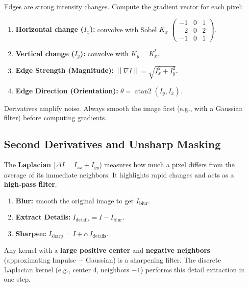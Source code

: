 \documentclass[11pt, oneside]{book}
\newcommand{\norm}[1]{\left\lVert #1 \right\rVert}
\newcommand{\T}{^{\mathsf{T}}}
\begin{document}
\begin{thmbox}[title={Reprojection Error Minimization}]
\begin{defbox}[title={Correlation and Convolution}]
\begin{thmbox}[title={Image Gradient (Edge Detection)}]
Edges are strong intensity changes. Compute the gradient vector for each pixel:
\begin{enumerate}
  \item \textbf{Horizontal change ($I_x$):} convolve with Sobel $K_x$ $\left(\begin{smallmatrix}-1&0&1\\-2&0&2\\-1&0&1\end{smallmatrix}\right)$.
  \item \textbf{Vertical change ($I_y$):} convolve with $K_y=K_x^{\T}$.
  \item \textbf{Edge Strength (Magnitude):} $\norm{\nabla I} = \sqrt{I_x^2 + I_y^2}$.
  \item \textbf{Edge Direction (Orientation):} $\theta = \operatorname{atan2}(I_y, I_x)$.
\end{enumerate}
\end{thmbox}

Derivatives amplify noise. Always smooth the image first (e.g., with a Gaussian filter) before computing gradients.

\subsection{Second Derivatives and Unsharp Masking}

\begin{defbox}[title={Laplacian}]
The \textbf{Laplacian} ($\Delta I = I_{xx} + I_{yy}$) measures how much a pixel differs from the average of its
immediate neighbors. It highlights rapid changes and acts as a \textbf{high-pass filter}.
\end{defbox}

\begin{thmbox}[title={Unsharp Masking}]
\begin{enumerate}
  \item \textbf{Blur:} smooth the original image to get $I_{\text{blur}}$.
  \item \textbf{Extract Details:} $I_{\text{details}} = I - I_{\text{blur}}$.
  \item \textbf{Sharpen:} $I_{\text{sharp}} = I + \alpha\,I_{\text{details}}$.
\end{enumerate}
\end{thmbox}

Any kernel with a \textbf{large positive center} and \textbf{negative neighbors} (approximating Impulse $-$ Gaussian)
is a sharpening filter. The discrete Laplacian kernel (e.g., center 4, neighbors $-1$) performs this detail extraction in one step.


\end{defbox}
\end{thmbox}
\end{document}
